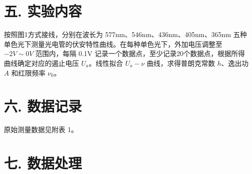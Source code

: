 \documentclass[12pt,a4paper]{article}
\begin{document}
	\section*{\textbf{{五. 实验内容}}}

	按照图1方式接线，分别在波长为 577nm、546nm、436nm、405nm、365nm 五种单色光下测量光电管的伏安特性曲线。在每种单色光下，外加电压调整至 \(-2V \sim 0V\) 范围内，每隔 0.1V 记录一个数据点，至少记录20个数据点，根据所得曲线确定对应的遏止电压 $U_a$。线性拟合 $U_a - \nu$ 曲线，求得普朗克常数 $h$、逸出功 $A$ 和红限频率 $\nu_0$。
	
	\section*{\textbf{{六. 数据记录}}}
	
	原始测量数据见附表 1。

	\section*{\textbf{{七. 数据处理}}}
\end{document}
